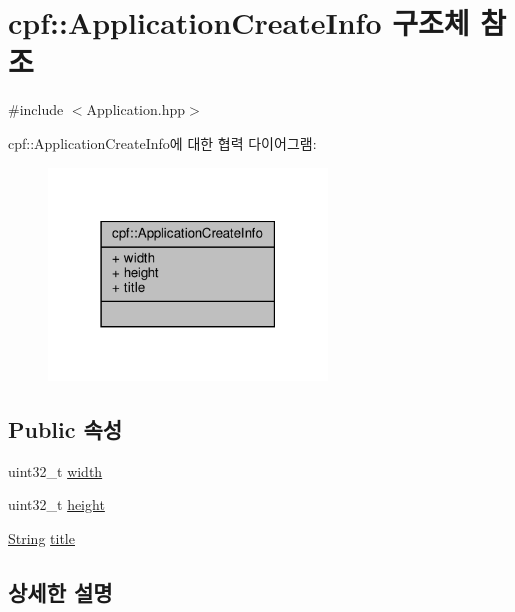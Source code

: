 \hypertarget{structcpf_1_1_application_create_info}{}\section{cpf\+:\+:Application\+Create\+Info 구조체 참조}
\label{structcpf_1_1_application_create_info}


{\ttfamily \#include $<$Application.\+hpp$>$}



cpf\+:\+:Application\+Create\+Info에 대한 협력 다이어그램\+:\nopagebreak
\begin{figure}[H]
\begin{center}
\leavevmode
\includegraphics[width=210pt]{structcpf_1_1_application_create_info__coll__graph}
\end{center}
\end{figure}
\subsection*{Public 속성}
\begin{DoxyCompactItemize}
\item 
uint32\+\_\+t \hyperlink{structcpf_1_1_application_create_info_a5fbc8d17129dfb2bfe37432132e214c0}{width}
\item 
uint32\+\_\+t \hyperlink{structcpf_1_1_application_create_info_ad4f22ba65d9f55b667fe38a729166ec1}{height}
\item 
\hyperlink{namespacecpf_a4dbd6992c3ed4440ce7ed8982ff7ffea}{String} \hyperlink{structcpf_1_1_application_create_info_a524aeb95e2ea78c56409a0d60f211be2}{title}
\end{DoxyCompactItemize}


\subsection{상세한 설명}


